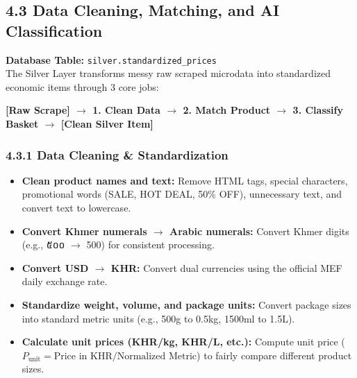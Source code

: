 \documentclass[10pt,a4paper]{article}
\begin{document}
\subsection*{4.3 Data Cleaning, Matching, and AI Classification}
\noindent\textbf{Database Table:} \texttt{silver.standardized\_prices}\\[0.05cm]
The Silver Layer transforms messy raw scraped microdata into standardized economic items through 3 core jobs:
\begin{center}
    \textbf{[Raw Scrape] $\longrightarrow$ 1. Clean Data $\longrightarrow$ 2. Match Product $\longrightarrow$ 3. Classify Basket $\longrightarrow$ [Clean Silver Item]}
\end{center}

\subsubsection*{4.3.1 Data Cleaning \& Standardization}
\begin{itemize}[noitemsep,topsep=1pt,leftmargin=*]
    \item \textbf{Clean product names and text:} Remove HTML tags, special characters, promotional words (SALE, HOT DEAL, 50\% OFF), unnecessary text, and convert text to lowercase.
    \item \textbf{Convert Khmer numerals $\rightarrow$ Arabic numerals:} Convert Khmer digits (e.g., {\khmerfont ៥០០} $\rightarrow$ 500) for consistent processing.
    \item \textbf{Convert USD $\rightarrow$ KHR:} Convert dual currencies using the official MEF daily exchange rate.
    \item \textbf{Standardize weight, volume, and package units:} Convert package sizes into standard metric units (e.g., 500g to 0.5kg, 1500ml to 1.5L).
    \item \textbf{Calculate unit prices (KHR/kg, KHR/L, etc.):} Compute unit price ($P_{\text{unit}} = \text{Price in KHR} / \text{Normalized Metric}$) to fairly compare different product sizes.
\end{itemize}
\end{document}
